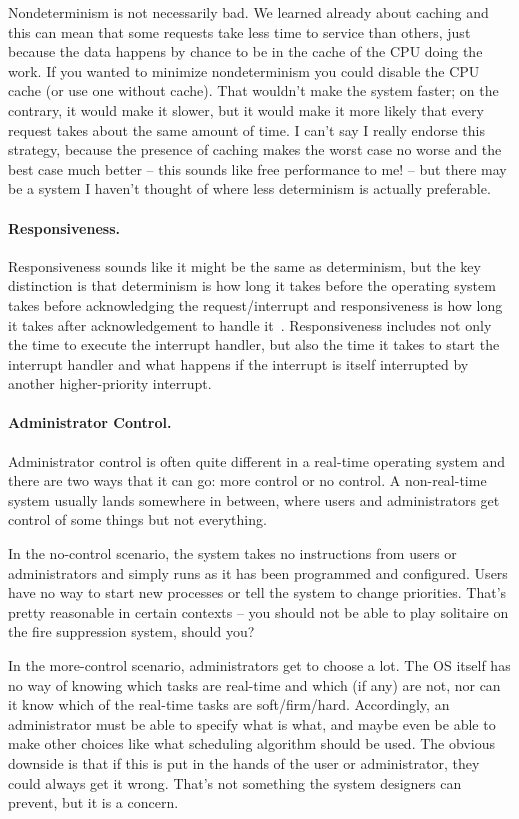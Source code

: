 Nondeterminism is not necessarily bad. We learned already about caching and this can mean that some requests take less time to service than others, just because the data happens by chance to be in the cache of the CPU doing the work. If you wanted to minimize nondeterminism you could disable the CPU cache (or use one without cache). That wouldn't make the system faster; on the contrary, it would make it slower, but it would make it more likely that every request takes about the same amount of time. I can't say I really endorse this strategy, because the presence of caching makes the worst case no worse and the best case much better -- this sounds like free performance to me! -- but there may be a system I haven't thought of where less determinism is actually preferable.

\paragraph{Responsiveness.} Responsiveness sounds like it might be the same as determinism, but the key distinction is that determinism is how long it takes before the operating system takes before acknowledging the request/interrupt and responsiveness is how long it takes after acknowledgement to handle it~\cite{osi}. Responsiveness includes not only the time to execute the interrupt handler, but also the time it takes to start the interrupt handler and what happens if the interrupt is itself interrupted by another higher-priority interrupt.

\paragraph{Administrator Control.} Administrator control is often quite different in a real-time operating system and there are two ways that it can go: more control or no control. A non-real-time system usually lands somewhere in between, where users and administrators get control of some things but not everything.

In the no-control scenario, the system takes no instructions from users or administrators and simply runs as it has been programmed and configured. Users have no way to start new processes or tell the system to change priorities. That's pretty reasonable in certain contexts -- you should not be able to play solitaire on the fire suppression system, should you?

In the more-control scenario, administrators get to choose a lot. The OS itself has no way of knowing which tasks are real-time and which (if any) are not, nor can it know which of the real-time tasks are soft/firm/hard. Accordingly, an administrator must be able to specify what is what, and maybe even be able to make other choices like what scheduling algorithm should be used. The obvious downside is that if this is put in the hands of the user or administrator, they could always get it wrong. That's not something the system designers can prevent, but it is a concern.


